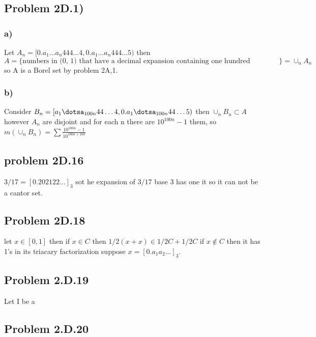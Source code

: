 \documentclass[paper=letter, fontsize=11pt]{scrartcl} %
\newcommand{\set}[1]{\{#1\}}
\begin{document}
\subsection{Problem 2D.1)}
\subsubsection*{a)}
Let $A_n = [0.a_1\dots a_n 444\dots4,0.a_1\dots a_n 444\dots5)$ then $A=\set{\text{numbers in (0, 1) that have a decimal
expansion containing one hundred consecutive 4s}}= \cup _n A_n$ so A is a Borel set by problem 2A,1.
\subsubsection*{b)}
Consider $B_n=[a_1\dotsa_{100n}44\dots4,0.a_1\dotsa_{100n}44\dots5)$ then $\cup_n B_n \subset A$ however $A_n$ are disjoint and for each n there are $10^{100n}-1$ them, so $m(\cup_n B_n) = \sum \frac{10^{100n}-1}{10^{100n+100}} $
\subsection{problem 2D.16}
$3/17= [0.202122...]_3$ sot he expansion of $3/17$ base 3 has one it so it can not be a cantor set.
\subsection{Problem 2D.18}
let $x \in [0,1]$ then if $x \in C$ then $1/2(x+x) \in  1/2C+1/2C$
if $x \not \in C$ then it has 1's in its triacary factorization suppose $x = [0.a_1a_2\dots]_3$.
\newpage
\subsection{Problem 2.D.19}
Let I be a 
\subsection{Problem 2.D.20}
\end{document}
